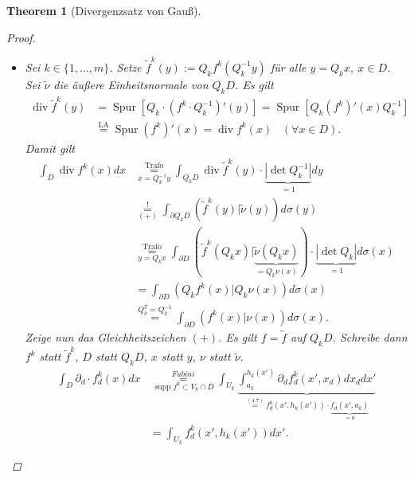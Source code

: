 \documentclass[a4paper]{scrreprt}
\newcommand{\overunderset}[3]{\overset{#1}{\underset{#3}{#2}}}
\newcommand{\jshortlink}[1]{\jhyperref{#1}{\text{#1}}}
\newcommand{\jhyperref}[2]{\hyperref[j_#1]{#2}}
\newcommand{\jlinkFubini}{\jhyperref{Fubini}{Fubini}}
\newcommand{\supp}{\mathop{\mathrm{{supp}}}}
\newcommand{\Spur}{\mathop{\mathrm{{Spur}}}}
\renewcommand{\div}{\mathop{\mathrm{{div}}}}
\theoremstyle{plain}
\newtheorem{thm}{Theorem}[chapter]
\theoremstyle{definition}
\begin{document}
{{{{\begin{thm}[Divergenzsatz von Gauß]
\begin{proof}
\begin{itemize}
            \item[3)]
                Sei $k\in \{1,\dots,m\}$. Setze $\tilde{f}^k(y) := Q_k f^k(Q_k^{-1}y)$ für alle $y = Q_k x, \ x\in D$. Sei $\tilde{\nu}$ die äußere Einheitsnormale von $Q_k D$. Es gilt
                \[
                    \begin{split}
                        \div \tilde{f}^k(y) &= \Spur \left[Q_k \cdot (f^k\cdot Q_k^{-1})'(y) \right] = \Spur \left[ Q_k (f^k)'(x) Q_k^{-1} \right]\\
                        &\overset{\text{LA}}{=} \Spur (f^k)'(x) = \div f^k(x) \hspace{10pt} (\forall x\in D).
                    \end{split}
                \]
                Damit gilt
                \[
                    \begin{split}
                        \int_D \div f^k(x) dx &\overunderset{\jshortlink{Trafo}}{=}{x = Q_k^{-1}y} \int_{Q_k D} \div \tilde{f}^k(y) \cdot \underbrace{|\det Q_k^{-1}|}_{=1} dy\\
                        &\overunderset{!}{=}{(+)} \int_{\partial Q_k D} \left(\tilde{f}^k(y) | \tilde{\nu}(y) \right) d\sigma(y)\\
                        &\overunderset{\jshortlink{Trafo}}{=}{y = Q_k x} \int_{\partial D} (\tilde{f}^k(Q_k x)| \underbrace{\tilde{\nu}(Q_k x)}_{=Q_k \nu(x)} ) \cdot \underbrace{|\det Q_k|}_{=1} d\sigma(x)\\
                        &= \int_{\partial D} (Q_k f^k(x)| Q_k \nu(x))d\sigma(x)\\
                        &\overset{Q_k^T = Q_k^{-1}}{=} \int_{\partial D} (f^k(x)| \nu(x))d\sigma(x).
                    \end{split}
                \]
                Zeige nun das Gleichheitszeichen $(+)$. Es gilt $f=\tilde{f}$ auf $Q_k D$. Schreibe dann $f^k$ statt $\tilde{f}^k$, $D$ statt $Q_k D$, $x$ statt $y$, $\nu$ statt $\tilde{\nu}$.
                \[
                    \tag{$*$}
                    \begin{split}
                        \int_D \partial_d \cdot f_d^k(x) dx &\overunderset{\jlinkFubini}{=}{\supp f^k \subset V_k \cap \overline{D}} \int_{U_k} \underbrace{\int_{a_k}^{h_k(x')} \partial_d f_d^k(x', x_d) dx_d dx'}_{\overset{(4.7)}{=} f_d^k(x',h_k(x')) \cdot \underbrace{f_d(x', a_k)}_{=0}}\\
                        &=\int_{U_k} f_d^k(x', h_k(x')) dx'.
                    \end{split}
\]
\end{itemize}
\end{proof}
\end{thm}}}}}
\end{document}
